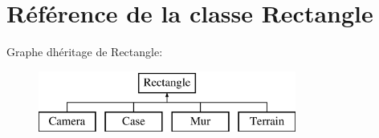 \hypertarget{class_rectangle}{}\section{Référence de la classe Rectangle}
\label{class_rectangle}
Graphe d\textquotesingle{}héritage de Rectangle\+:\begin{figure}[H]
\begin{center}
\leavevmode
\includegraphics[height=2.000000cm]{class_rectangle}
\end{center}
\end{figure}
